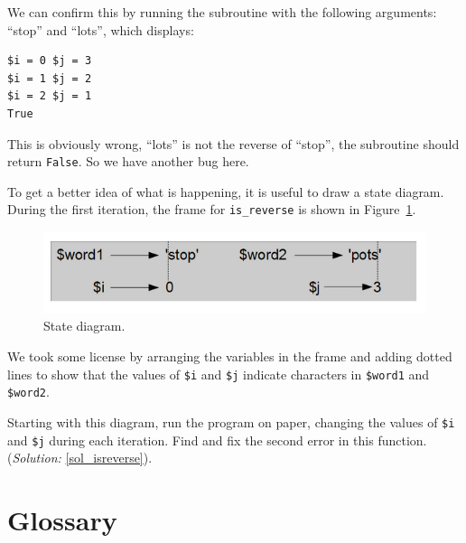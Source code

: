 We can confirm this by running the subroutine with the 
following arguments: ``stop'' and ``lots'', which displays:

\begin{verbatim}
$i = 0 $j = 3
$i = 1 $j = 2
$i = 2 $j = 1
True
\end{verbatim}
%

This is obviously wrong, ``lots'' is not the reverse of 
``stop'', the subroutine should return {\tt False}. So we 
have another bug here.

To get a better idea of what is
happening, it is useful to draw a state diagram.  During the first
iteration, the frame for \verb"is_reverse" is shown in
Figure~\ref{fig.state4}.   

\begin{figure}
\centerline
{\includegraphics[scale=0.5]{figs/state6.png}}
\caption{State diagram.}
\label{fig.state4}
\end{figure}

We took some license by arranging the variables in the frame
and adding dotted lines to show that the values of {\tt \$i} 
and {\tt \$j} indicate characters in {\tt \$word1} and 
{\tt \$word2}.

Starting with this diagram, run the program on paper, changing 
the values of {\tt \$i} and {\tt \$j} during each iteration. 
Find and fix the second error in this function. (\emph{Solution:} \ref{sol_isreverse}).
\label{isreverse}


\section{Glossary}

